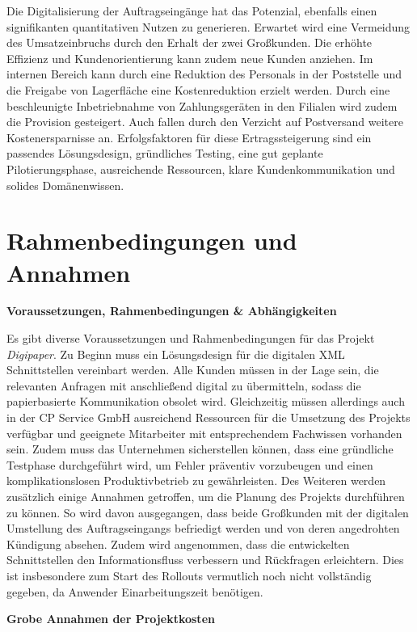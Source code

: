 Die Digitalisierung der Auftragseingänge hat das Potenzial, ebenfalls einen signifikanten quantitativen Nutzen zu generieren. Erwartet wird eine Vermeidung des Umsatzeinbruchs durch den Erhalt der zwei Großkunden. Die erhöhte Effizienz und Kundenorientierung kann zudem neue Kunden anziehen. Im internen Bereich kann durch eine Reduktion des Personals in der Poststelle und die Freigabe von Lagerfläche eine Kostenreduktion erzielt werden. Durch eine beschleunigte Inbetriebnahme von Zahlungsgeräten in den Filialen wird zudem die Provision gesteigert. Auch fallen durch den Verzicht auf Postversand weitere Kostenersparnisse an. Erfolgsfaktoren für diese Ertragssteigerung sind ein passendes Lösungsdesign, gründliches Testing, eine gut geplante Pilotierungsphase, ausreichende Ressourcen, klare Kundenkommunikation und solides Domänenwissen.

\section{Rahmenbedingungen und Annahmen}

\textbf{Voraussetzungen, Rahmenbedingungen \& Abhängigkeiten}
\vspace{0.1cm}

Es gibt diverse Voraussetzungen und Rahmenbedingungen für das Projekt \textit{Digipaper}. Zu Beginn muss ein Lösungsdesign für die digitalen XML Schnittstellen vereinbart werden. Alle Kunden müssen in der Lage sein, die relevanten Anfragen mit anschließend digital zu übermitteln, sodass die papierbasierte Kommunikation obsolet wird. Gleichzeitig müssen allerdings auch in der CP Service GmbH ausreichend Ressourcen für die Umsetzung des Projekts verfügbar und geeignete Mitarbeiter mit entsprechendem Fachwissen vorhanden sein. Zudem muss das Unternehmen sicherstellen können, dass eine gründliche Testphase durchgeführt wird, um Fehler präventiv vorzubeugen und einen komplikationslosen Produktivbetrieb zu gewährleisten. Des Weiteren werden zusätzlich einige Annahmen getroffen, um die Planung des Projekts durchführen zu können. So wird davon ausgegangen, dass beide Großkunden mit der digitalen Umstellung des Auftragseingangs befriedigt werden und von deren angedrohten Kündigung absehen. Zudem wird angenommen, dass die entwickelten Schnittstellen den Informationsfluss verbessern und Rückfragen erleichtern. Dies ist insbesondere zum Start des Rollouts vermutlich noch nicht vollständig gegeben, da Anwender Einarbeitungszeit benötigen. 

\vspace{10pt}
\textbf{Grobe Annahmen der Projektkosten}
\vspace{0.1cm}

